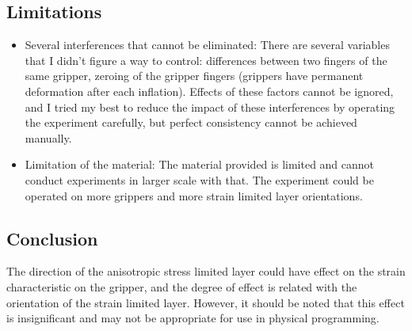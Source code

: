 \documentclass[conference]{IEEEtran}
\begin{document}
\subsection{Limitations}
\begin{itemize}
    \item Several interferences that cannot be eliminated: There are several variables that I didn't figure a way to control: differences between two fingers of the same gripper, zeroing of the gripper fingers (grippers have permanent deformation after each inflation). Effects of these factors cannot be ignored, and I tried my best to reduce the impact of these interferences by operating the experiment carefully, but perfect consistency cannot be achieved manually.
    \item Limitation of the material: The material provided is limited and cannot conduct experiments in larger scale with that. The experiment could be operated on more grippers and more strain limited layer orientations.
\end{itemize}
% 

\subsection{Conclusion}

The direction of the anisotropic stress limited layer could have effect on the strain characteristic on the gripper, and the degree of effect is related with the orientation of the strain limited layer. However, it should be noted that this effect is insignificant and may not be appropriate for use in physical programming.




 

\end{document}

